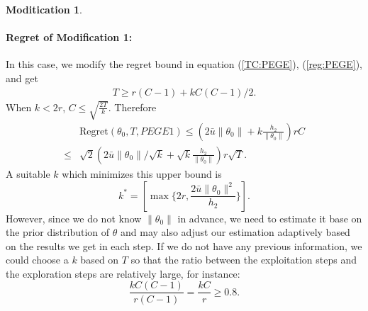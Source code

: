 \documentclass{article}
\theoremstyle{plain}
\theoremstyle{definition}
\newtheorem{modification}{Moditication}
\begin{document}
\begin{modification}
\paragraph{Regret of Modification 1:}
In this case, we modify the regret bound in equation (\ref{TC:PEGE}), (\ref{reg:PEGE}), and get
\begin{align}
T \geq r(C-1)+k{C(C-1)}/{2}.
\end{align}
When $k<2r$, $C\leq\sqrt{\frac{2T}{k}}$. Therefore
\begin{align}
& \text{Regret}(\theta_0, T, PEGE1)\leq (2\bar{u}\|\theta_0\|+k\frac{h_2}{\|\theta_0\|})rC \nonumber\\
\leq & \sqrt{2}(2\bar{u}\|\theta_0\|/\sqrt{k}+\sqrt{k}\frac{h_2}{\|\theta_0\|})r\sqrt{T}.
\end{align}
A suitable $k$ which minimizes this upper bound is
\begin{equation}
k^*=\left[\max\{2r, \frac{2\bar{u}\|\theta_0\|^2}{h_2}\}\right]. \nonumber 
\end{equation}
However, since we do not know $\|\theta_0\|$ in advance, we need to estimate it base on the prior distribution of $\theta$ and may also adjust our estimation adaptively based on the results we get in each step. If we do not have any previous information, we could choose a $k$ based on $T$ so that the ratio between the exploitation steps and the exploration steps are relatively large, for instance:
\begin{equation}
\frac{kC(C-1)}{r(C-1)}=\frac{kC}{r}\geq 0.8. \nonumber 
\end{equation}

\end{modification}


\end{document}

